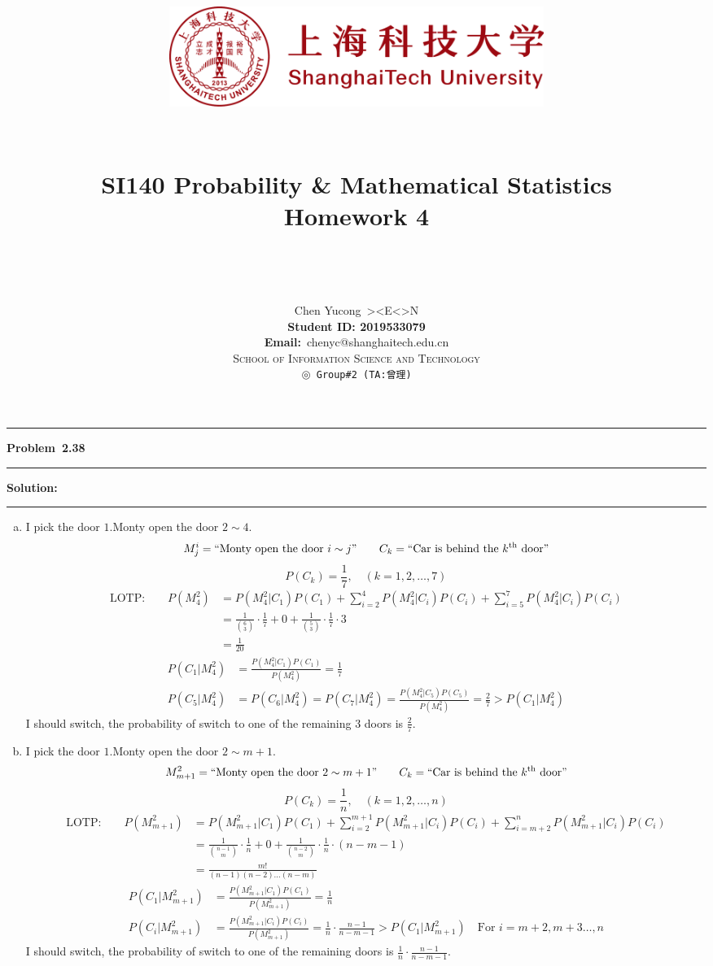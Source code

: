 \documentclass[10.5pt]{article}
\title{
	\normalfont \normalsize
	\begin{figure}[!h]
	\centering
	\includegraphics[width=4.8in, keepaspectratio]{logo_red.pdf}\\[1cm]
	\end{figure}
	\horrule{0.5pt} \\[0.4cm]
	\Huge SI140 Probability \& Mathematical Statistics\\[0.4cm]
	\LARGE Homework 4\\
	\horrule{2pt} \\[1.5cm]
}
\author{\Song{\huge\textbf{陈昱聪}}\\[0.2cm]Chen Yucong\ ><E<>N\\[4.5cm]\textbf{Student ID: 2019533079}\\[0.2cm] 
\textbf{Email:}\ {\ttfamily chenyc@shanghaitech.edu.cn}\\[0.8cm] \LARGE\textsc{School of Information Science and Technology}\\[0.63cm]
\texttt{$\circledcirc$ Group\#2\ (TA:曾理)}}
\date{}
\newcommand\question[1]{\vspace{.2in}\hrule\vspace{0.04in}\textbf{Problem\ #1}\vspace{.4em}\hrule\vspace{.10in}}
\newcommand\Solution{\vspace{.3in}\textbf{Solution:}\vspace{.5em}\hrule\vspace{.08in}\par}
\begin{document}
	
\maketitle
\thispagestyle{firstpage}
\thispagestyle{empty}
\setcounter{page}{0}

\pagebreak

\question{2.38}
	\Solution{}
    \begin{enumerate}[(a)]
        \item I pick the door $1$.\quad Monty open the door $2\sim 4$.
	$$M_j^i = ``\text{Monty open the door}\ i\sim j"\qquad C_k = ``\text{Car is behind the}\ k^{\text{th}}\ \text{door}"$$
	$$P(C_k) = \frac{1}{7},\quad (k = 1, 2, \dots, 7)$$
	\begin{align*}
\text{LOTP:}\qquad P(M^2_4) &= P(M^2_4|C_1)P(C_1)+\sum_{i = 2}^{4}P(M^2_4|C_i)P(C_i)+\sum_{i = 5}^{7}P(M^2_4|C_i)P(C_i)\\[8pt]
&=\frac{1}{\binom{6}{3}}\cdot\frac{1}{7}+0+\frac{1}{\binom{5}{3}}\cdot\frac{1}{7}\cdot3\\[8pt]
&=\frac{1}{20}
\end{align*}
\begin{align*}
                P(C_1|M^2_4) &= \frac{P(M^2_4|C_1)P(C_1)}{P(M^2_4)} = \frac{1}{7}\\[8pt]
                P(C_5|M^2_4) &=P(C_6|M^2_4)=P(C_7|M^2_4) = \frac{P(M^2_4|C_5)P(C_5)}{P(M^2_4)} = \frac{2}{7}>P(C_1|M^2_4)
        \end{align*}
        I should switch, the probability of switch to one of the remaining $3$ doors is $\frac{2}{7}$.

\vspace{1cm}
        \item I pick the door $1$.\quad Monty open the door $2\sim m+1$.
	$$M_{m+1}^2 = ``\text{Monty open the door}\ 2\sim m+1"\qquad C_k = ``\text{Car is behind the}\ k^{\text{th}}\ \text{door}"$$
	$$P(C_k) = \frac{1}{n},\quad (k = 1, 2, \dots, n)$$
	\begin{align*}
\text{LOTP:}\qquad P(M^2_{m+1}) &= P(M^2_{m+1}|C_1)P(C_1)+\sum_{i = 2}^{m+1}P(M^2_{m+1}|C_i)P(C_i)+\sum_{i = m+2}^{n}P(M^2_{m+1}|C_i)P(C_i)\\[8pt]
&=\frac{1}{\binom{n-1}{m}}\cdot\frac{1}{n}+0+\frac{1}{\binom{n-2}{m}}\cdot\frac{1}{n}\cdot(n-m-1)\\[8pt]
&=\frac{m!}{(n-1)(n-2)\dots(n-m)}
\end{align*}
\begin{align*}
                P(C_1|M^2_{m+1}) &= \frac{P(M^2_{m+1}|C_1)P(C_1)}{P(M^2_{m+1})} = \frac{1}{n}\\[8pt]
				P(C_i|M^2_{m+1}) &=\frac{P(M^2_{m+1}|C_i)P(C_i)}{P(M^2_{m+1})} = \frac{1}{n}\cdot\frac{n-1}{n-m-1}>P(C_1|M^2_{m+1})\quad\text{For $i = m+2, m+3\dots, n$}
        \end{align*}
        I should switch, the probability of switch to one of the remaining doors is $\frac{1}{n}\cdot\frac{n-1}{n-m-1}$.
    \end{enumerate}
		
\end{document}
